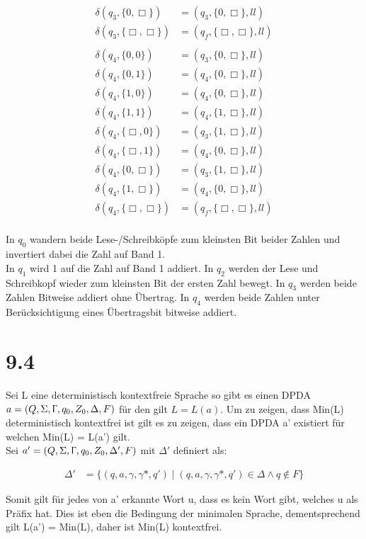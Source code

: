 \documentclass[12pt, a4paper]{article}
\begin{document}
\begin{align*}
\delta(q_3, \{0,\Box\}) &=(q_3, \{0,\Box\},ll)\\
\delta(q_3, \{\Box,\Box\}) &=(q_f, \{\Box,\Box\},ll)\\
\\
\delta(q_4, \{0,0\}) &=(q_3, \{0,\Box\},ll)\\
\delta(q_4, \{0,1\}) &=(q_4, \{0,\Box\},ll)\\
\delta(q_4, \{1,0\}) &=(q_4, \{0,\Box\},ll)\\
\delta(q_4, \{1,1\}) &=(q_4, \{1,\Box\},ll)\\
\delta(q_4, \{\Box,0\}) &=(q_3, \{1,\Box\},ll)\\
\delta(q_4, \{\Box,1\}) &=(q_4, \{0,\Box\},ll)\\
\delta(q_4, \{0,\Box\}) &=(q_3, \{1,\Box\},ll)\\
\delta(q_4, \{1,\Box\}) &=(q_4, \{0,\Box\},ll)\\
\delta(q_4, \{\Box,\Box\}) &=(q_f, \{\Box,\Box\},ll)\\
\end{align*}

In $q_0$ wandern beide Lese-/Schreibköpfe zum kleinsten Bit beider Zahlen und invertiert dabei die Zahl auf Band 1.\\
In $q_1$ wird 1 auf die Zahl auf Band 1 addiert.
In $q_2$ werden der Lese und Schreibkopf wieder zum kleinsten Bit der ersten Zahl bewegt.
In $q_3$ werden beide Zahlen Bitweise addiert ohne Übertrag.
In $q_4$ werden beide Zahlen unter Berücksichtigung eines Übertragsbit bitweise addiert.


\section*{9.4}
Sei L eine deterministisch kontextfreie Sprache so gibt es einen DPDA $a = (Q, \Sigma, \Upgamma, q_0, Z_0, \Delta, F)$ für den gilt $L = L(a)$.
Um zu zeigen, dass Min(L) deterministisch kontextfrei ist gilt es zu zeigen, dass ein DPDA a' existiert für welchen Min(L) = L(a') gilt. \\

Sei $a' = (Q, \Sigma, \Upgamma, q_0, Z_0, \Delta', F)$ mit $\Delta'$ definiert als: 

\begin{align*}
\Delta' &= \{(q, a, \gamma, \gamma*, q') \mid  (q, a, \gamma, \gamma*, q') \in \Delta \wedge q \notin F \}
\end{align*}

Somit gilt für jedes von a' erkannte Wort u, dass es kein Wort gibt, welches u als Präfix hat. Dies ist eben die Bedingung der minimalen Sprache, dementsprechend gilt L(a') = Min(L), daher ist Min(L) kontextfrei.
\end{document}
